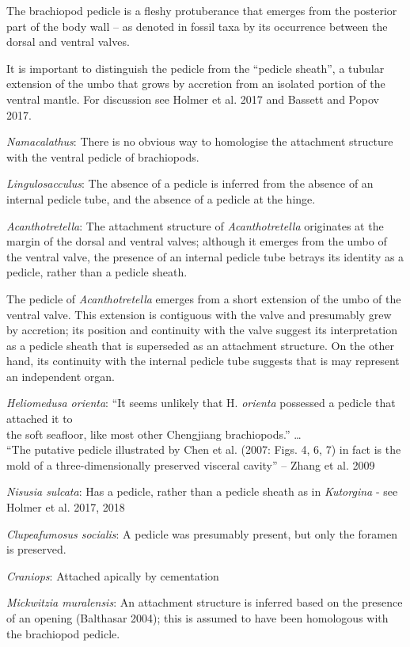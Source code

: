 \documentclass[]{book}
\theoremstyle{definition}
\theoremstyle{definition}
\theoremstyle{definition}
\theoremstyle{remark}
\begin{document}
The brachiopod pedicle is a fleshy protuberance that emerges from the
posterior part of the body wall -- as denoted in fossil taxa by its
occurrence between the dorsal and ventral valves.

It is important to distinguish the pedicle from the ``pedicle sheath'',
a tubular extension of the umbo that grows by accretion from an isolated
portion of the ventral mantle. For discussion see Holmer et al. 2017 and
Bassett and Popov 2017.

\emph{Namacalathus}: There is no obvious way to homologise the
attachment structure with the ventral pedicle of brachiopods.

\emph{Lingulosacculus}: The absence of a pedicle is inferred from the
absence of an internal pedicle tube, and the absence of a pedicle at the
hinge.

\emph{Acanthotretella}: The attachment structure of
\emph{Acanthotretella} originates at the margin of the dorsal and
ventral valves; although it emerges from the umbo of the ventral valve,
the presence of an internal pedicle tube betrays its identity as a
pedicle, rather than a pedicle sheath.

The pedicle of \emph{Acanthotretella} emerges from a short extension of
the umbo of the ventral valve. This extension is contiguous with the
valve and presumably grew by accretion; its position and continuity with
the valve suggest its interpretation as a pedicle sheath that is
superseded as an attachment structure. On the other hand, its continuity
with the internal pedicle tube suggests that is may represent an
independent organ.

\emph{Heliomedusa orienta}: ``It seems unlikely that H. \emph{orienta}
possessed a pedicle that attached it to\\
the soft seafloor, like most other Chengjiang brachiopods.'' \ldots{}\\
``The putative pedicle illustrated by Chen et al. (2007: Figs. 4, 6, 7)
in fact is the mold of a three-dimensionally preserved visceral cavity''
-- Zhang et al. 2009

\emph{Nisusia sulcata}: Has a pedicle, rather than a pedicle sheath as
in \emph{Kutorgina} - see Holmer et al. 2017, 2018

\emph{Clupeafumosus socialis}: A pedicle was presumably present, but
only the foramen is preserved.

\emph{Craniops}: Attached apically by cementation

\emph{Mickwitzia muralensis}: An attachment structure is inferred based
on the presence of an opening (Balthasar 2004); this is assumed to have
been homologous with the brachiopod pedicle.
\end{document}
